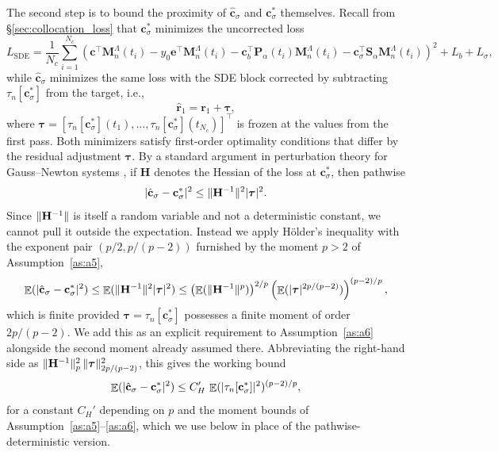 \documentclass[11pt, a4paper]{article}
\theoremstyle{theoremstyle}
\theoremstyle{definitionstyle}
\DeclareMathOperator{\EE}{\mathbb E}
\DeclarePairedDelimiter{\norm}{\lVert}{\rVert}
\DeclarePairedDelimiter{\abs}{\lvert}{\rvert}
\begin{document}
The second step is to bound the proximity of $\hat{\mathbf c}_\sigma$ and $\mathbf c^*_\sigma$ themselves. Recall from \S\ref{sec:collocation_loss} that $\mathbf c^*_\sigma$ minimizes the uncorrected loss
\begin{equation}
    L_{\mathrm{SDE}} = \frac 1{N_c}\sum_{i=1}^{N_c} \left ( \mathbf c^\top \mathbf M_n^\Lambda(t_i) - y_0\mathbf e^\top \mathbf M_n^\Lambda(t_i) - \mathbf c_b^\top \mathbf P_\alpha(t_i) \mathbf M_n^\Lambda(t_i) - \mathbf c_\sigma^\top \mathbf S_\alpha \mathbf M_n^\Lambda(t_i) \right )^2 + L_b + L_\sigma,
\end{equation}
while $\hat{\mathbf c}_\sigma$ minimizes the same loss with the SDE block corrected by subtracting $\tau_n[\mathbf c^*_\sigma]$ from the target, i.e.,
\begin{equation}
    \hat{\mathbf r}_1 = \mathbf r_1 + \boldsymbol \tau,
\end{equation}
where $\boldsymbol \tau = [\tau_n[\mathbf c^*_\sigma](t_1), \ldots, \tau_n[\mathbf c^*_\sigma](t_{N_c})]^\top$ is frozen at the values from the first pass. Both minimizers satisfy first-order optimality conditions that differ by the residual adjustment $\boldsymbol \tau$. By a standard argument in perturbation theory for Gauss--Newton systems \cite{nualart2006malliavin}, if $\mathbf H$ denotes the Hessian of the loss at $\mathbf c^*_\sigma$, then pathwise
\begin{equation}
    \abs{\hat{\mathbf c}_\sigma - \mathbf c^*_\sigma}^2 \leq \norm{\mathbf H^{-1}}^2 \abs{\boldsymbol \tau}^2.
\end{equation}
Since $\norm{\mathbf H^{-1}}$ is itself a random variable and not a deterministic constant, we cannot pull it outside the expectation. Instead we apply H\"older's inequality with the exponent pair $(p/2, p/(p-2))$ furnished by the moment $p>2$ of Assumption~\ref{as:a5},
\begin{equation}
    \EE(\abs{\hat{\mathbf c}_\sigma - \mathbf c^*_\sigma}^2) \leq \EE(\norm{\mathbf H^{-1}}^2\abs{\boldsymbol \tau}^2) \leq \left ( \EE(\norm{\mathbf H^{-1}}^p) \right )^{2/p} \left ( \EE(\abs{\boldsymbol \tau}^{2p/(p-2)}) \right )^{(p-2)/p},
\end{equation}
which is finite provided $\boldsymbol \tau = \tau_n[\mathbf c^*_\sigma]$ possesses a finite moment of order $2p/(p-2)$. We add this as an explicit requirement to Assumption~\ref{as:a6} alongside the second moment already assumed there. Abbreviating the right-hand side as $\norm{\mathbf H^{-1}}_p^2\,\norm{\boldsymbol\tau}_{2p/(p-2)}^2$, this gives the working bound
\begin{equation}
    \EE(\abs{\hat{\mathbf c}_\sigma - \mathbf c^*_\sigma}^2) \leq C_H' \, \EE(\abs{\tau_n[\mathbf c^*_\sigma]}^2)^{(p-2)/p},
\end{equation}
for a constant $C_H'$ depending on $p$ and the moment bounds of Assumption~\ref{as:a5}--\ref{as:a6}, which we use below in place of the pathwise-deterministic version.
\end{document}
